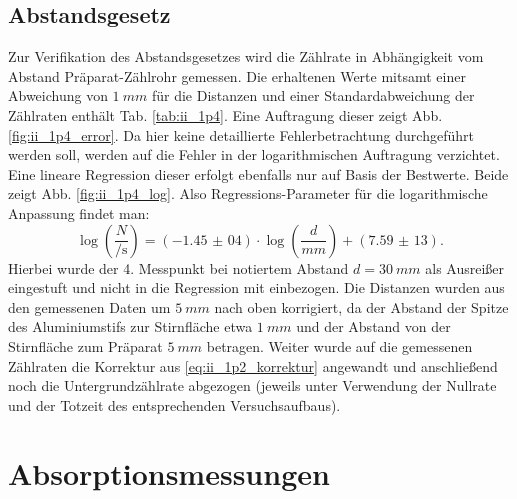 
\subsection{Abstandsgesetz}
Zur Verifikation des Abstandsgesetzes wird die Zählrate in Abhängigkeit vom Abstand Präparat-Zählrohr gemessen. Die erhaltenen Werte mitsamt einer Abweichung von $\SI{1}{mm}$ für die Distanzen und einer Standardabweichung der Zählraten enthält Tab. \ref{tab:ii_1p4}. Eine Auftragung dieser zeigt Abb. \ref{fig:ii_1p4_error}. Da hier keine detaillierte Fehlerbetrachtung durchgeführt werden soll, werden auf die Fehler in der logarithmischen Auftragung verzichtet. Eine lineare Regression dieser erfolgt ebenfalls nur auf Basis der Bestwerte. Beide zeigt Abb. \ref{fig:ii_1p4_log}. Also Regressions-Parameter für die logarithmische Anpassung findet man:
\begin{equation}
\log\left(\frac{N}{\si{\per\second}}\right) = (\num{-1,45(04)}) \cdot \log\left(\frac{d}{\si{mm}}\right) + (\num{7,59(13)}).
\end{equation}
Hierbei wurde der 4. Messpunkt bei notiertem Abstand $d = \SI{30}{mm}$ als Ausreißer eingestuft und nicht in die Regression mit einbezogen. Die Distanzen wurden aus den gemessenen Daten um $\SI{5}{mm}$ nach oben korrigiert, da der Abstand der Spitze des Aluminiumstifs zur Stirnfläche etwa $\SI{1}{mm}$ und der Abstand von der Stirnfläche zum Präparat $\SI{5}{mm}$ betragen. Weiter wurde auf die gemessenen Zählraten die Korrektur aus \eqref{eq:ii_1p2_korrektur} angewandt und anschließend noch die Untergrundzählrate abgezogen (jeweils unter Verwendung der Nullrate und der Totzeit des entsprechenden Versuchsaufbaus).




\FloatBarrier
\section{Absorptionsmessungen}
